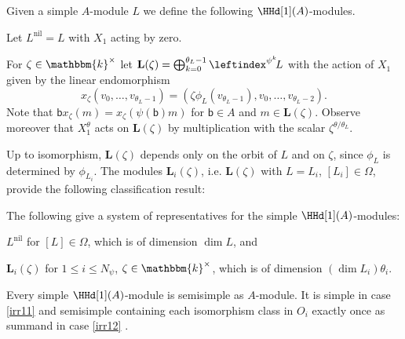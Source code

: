 \documentclass[a4paper,11pt]{amsart}
\numberwithin{equation}{subsection}
\theoremstyle{definition}
\theoremstyle{theorem}
\theoremstyle{remark}
\newcommand\bb{\mathsf{b}}
\newcommand\kk{\mathbbm{k}}
\begin{document}
\begin{Definition}\label{D:La}
 Given a simple $A$-module $L$ we define the following
  $\HHd[1](A)$-modules.
  \begin{Enumerate}
  \item Let $L^{\mathrm{nil}}=L$ with $X_1$ acting by zero.
  \item  For $\zeta\in\kk^\times$ let
  $\mathbf L(\zeta)=\bigoplus_{k=0}^{\theta_L-1}\leftindex^{\psi^k}\!L$ with
  the action of $X_1$ given by the linear endomorphism
  \[x_\zeta(v_0,\dots,v_{\theta_L-1})=(\zeta\phi_L(v_{\theta_L-1}),v_0,\dots,
  v_{\theta_L-2}). \]
  Note that $\bb x_\zeta(m)=x_\zeta(\psi(\bb)m)$ for
  $\bb\in A$ and $m\in \mathbf L(\zeta)$. Observe moreover that
  $X_1^\theta$ acts on $\mathbf L(\zeta)$ by multiplication with the scalar
  $\zeta^{\theta/\theta_L}$.
  \end{Enumerate}
\end{Definition}

Up to isomorphism, $\mathbf L(\zeta)$ depends only on the orbit of $L$ and on $\zeta$, since $\phi_L$ is determined by $\phi_{L_i}$. The modules $\mathbf L_i(\zeta)$, i.e. $\mathbf L(\zeta)$ with $L=L_i$, $[L_i]\in\Omega$, provide the following classification result:
\begin{Theorem}\label{T:simplesn1}
The following give a system of representatives for the simple $\HHd[1](A)$-modules:
  \begin{Enumerate}
    \item\label{irr11} $L^{\mathrm{nil}}$ for $[L]\in\Omega$, which is of dimension $\dim L$, and
    \item\label{irr12} $\mathbf L_i(\zeta)$ for $1\le i\le N_\psi$, $\zeta\in\kk^\times$, which is of
      dimension $(\dim L_i)\theta_i$.
  \end{Enumerate}
 Every simple $\HHd[1](A)$-module is semisimple as $A$-module. It is  simple in case \autoref{irr11}  and semisimple containing each isomorphism class in $O_i$ exactly once as summand in case \autoref{irr12} .
 \end{Theorem}
\end{document}
